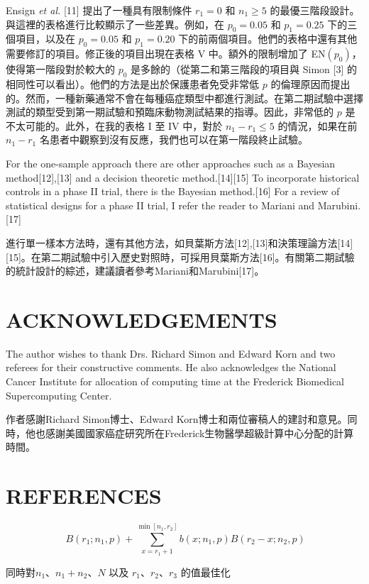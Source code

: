 Ensign \textit{et al.} [11] 提出了一種具有限制條件 $r_1=0$ 和 $n_1 \geq 5$ 的最優三階段設計。與這裡的表格進行比較顯示了一些差異。例如，在 $p_0=0.05$ 和 $p_1=0.25$ 下的三個項目，以及在 $p_0=0.05$ 和 $p_1=0.20$ 下的前兩個項目。他們的表格中還有其他需要修訂的項目。修正後的項目出現在表格 V 中。額外的限制增加了 EN$(p_0)$，使得第一階段對於較大的 $p_0$ 是多餘的（從第二和第三階段的項目與 Simon [3] 的相同性可以看出）。他們的方法是出於保護患者免受非常低 $p$ 的倫理原因而提出的。然而，一種新藥通常不會在每種癌症類型中都進行測試。在第二期試驗中選擇測試的類型受到第一期試驗和預臨床動物測試結果的指導。因此，非常低的 $p$ 是不太可能的。此外，在我的表格 I 至 IV 中，對於 $n_1 - r_1 \leq 5$ 的情況，如果在前 $n_1 - r_1$ 名患者中觀察到沒有反應，我們也可以在第一階段終止試驗。

For the one-sample approach there are other approaches such as a Bayesian method[12],[13] and a decision theoretic method.[14][15] To incorporate historical controls in a phase II trial, there is the Bayesian method.[16] For a review of statistical designs for a phase II trial, I refer the reader to Mariani and Marubini.[17]

進行單一樣本方法時，還有其他方法，如貝葉斯方法[12],[13]和決策理論方法[14][15]。在第二期試驗中引入歷史對照時，可採用貝葉斯方法[16]。有關第二期試驗的統計設計的綜述，建議讀者參考Mariani和Marubini[17]。
\section{ACKNOWLEDGEMENTS}
The author wishes to thank Drs. Richard Simon and Edward Korn and two referees for their constructive comments. He also acknowledges the National Cancer Institute for allocation of computing time at the Frederick Biomedical Supercomputing Center.

作者感謝Richard Simon博士、Edward Korn博士和兩位審稿人的建討和意見。同時，他也感謝美國國家癌症研究所在Frederick生物醫學超級計算中心分配的計算時間。
\section{REFERENCES}

\begin{equation}
\ B(r_1;n_1,p) + \sum_{x=r_1+1}^{\min[n_1,r_2]} b(x;n_1,p)B(r_2-x;n_2,p)  \label{eq99}
\end{equation}

同時對$n_1$、$n_1+n_2$、$N$ 以及 $r_1$、$r_2$、$r_3$ 的值最佳化



